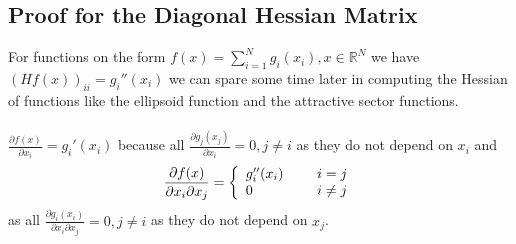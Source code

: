 \documentclass[a4paper]{article}
\begin{document}
\subsection{Proof for the Diagonal Hessian Matrix}
For functions on the form $f(x) = \sum_{i=1}^N
g_i(x_i), x\in \mathbb{R}^N$ we have $(Hf(x))_{ii} = g_i''(x_i)$ we can spare
some time later in computing the Hessian of functions like the ellipsoid
function and the attractive sector functions. \\\\
$\frac{\partial f(x)}{\partial x_i} = g_i'(x_i)$ because all $\frac{\partial g_j(x_j)}{\partial x_i}=0,j\neq i$ as they do not depend on $x_i$ and
\begin{align*}
  \frac{\partial f(x)}{\partial x_i \partial x_j} =   \left\{
  \begin{array}{ll}
    g_i''(x_i) \hspace*{5mm}  & i=j\\
    0                        & i\neq j
  \end{array}
  \right.
\end{align*}
as all $\frac{\partial g_i(x_i)}{\partial x_i \partial x_j}=0,j\neq i$ as they do not depend on $x_j$.
\end{document}
